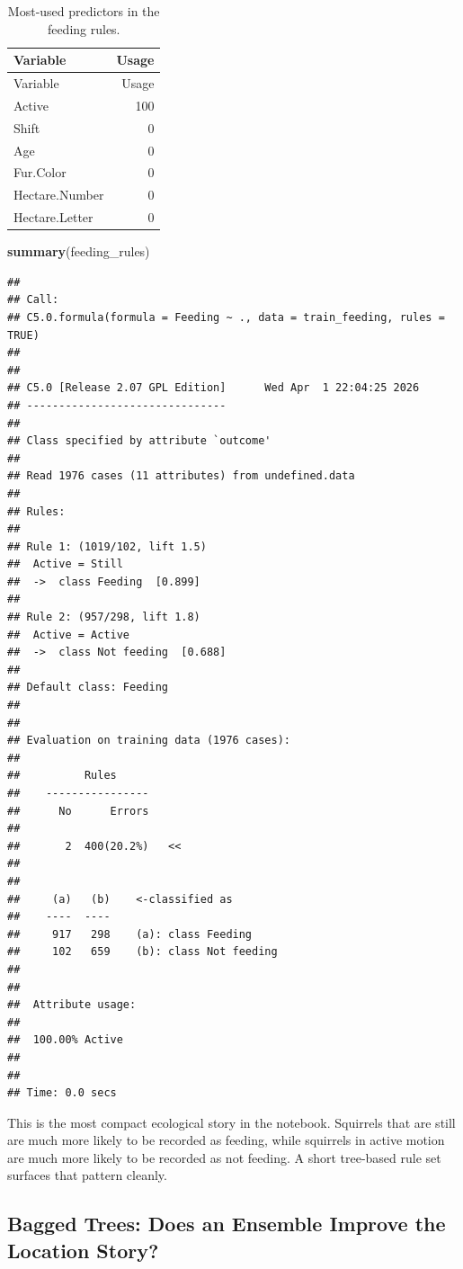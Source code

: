 \documentclass[
  11pt,
]{article}
\newenvironment{Shaded}{\begin{snugshade}}{\end{snugshade}}
\newcommand{\FunctionTok}[1]{\textcolor[rgb]{0.13,0.29,0.53}{\textbf{#1}}}
\newcommand{\NormalTok}[1]{#1}
\begin{document}
\begin{longtable}[]{@{}lr@{}}
\caption{Most-used predictors in the feeding rules.}\tabularnewline
\toprule\noalign{}
Variable & Usage \\
\midrule\noalign{}
\endfirsthead
\toprule\noalign{}
Variable & Usage \\
\midrule\noalign{}
\endhead
\bottomrule\noalign{}
\endlastfoot
Active & 100 \\
Shift & 0 \\
Age & 0 \\
Fur.Color & 0 \\
Hectare.Number & 0 \\
Hectare.Letter & 0 \\
\end{longtable}

\begin{Shaded}
\begin{Highlighting}[]
\FunctionTok{summary}\NormalTok{(feeding\_rules)}
\end{Highlighting}
\end{Shaded}

\begin{verbatim}
## 
## Call:
## C5.0.formula(formula = Feeding ~ ., data = train_feeding, rules = TRUE)
## 
## 
## C5.0 [Release 2.07 GPL Edition]      Wed Apr  1 22:04:25 2026
## -------------------------------
## 
## Class specified by attribute `outcome'
## 
## Read 1976 cases (11 attributes) from undefined.data
## 
## Rules:
## 
## Rule 1: (1019/102, lift 1.5)
##  Active = Still
##  ->  class Feeding  [0.899]
## 
## Rule 2: (957/298, lift 1.8)
##  Active = Active
##  ->  class Not feeding  [0.688]
## 
## Default class: Feeding
## 
## 
## Evaluation on training data (1976 cases):
## 
##          Rules     
##    ----------------
##      No      Errors
## 
##       2  400(20.2%)   <<
## 
## 
##     (a)   (b)    <-classified as
##    ----  ----
##     917   298    (a): class Feeding
##     102   659    (b): class Not feeding
## 
## 
##  Attribute usage:
## 
##  100.00% Active
## 
## 
## Time: 0.0 secs
\end{verbatim}

This is the most compact ecological story in the notebook. Squirrels
that are still are much more likely to be recorded as feeding, while
squirrels in active motion are much more likely to be recorded as not
feeding. A short tree-based rule set surfaces that pattern cleanly.

\subsection{Bagged Trees: Does an Ensemble Improve the Location
Story?}\label{bagged-trees-does-an-ensemble-improve-the-location-story}
\end{document}
